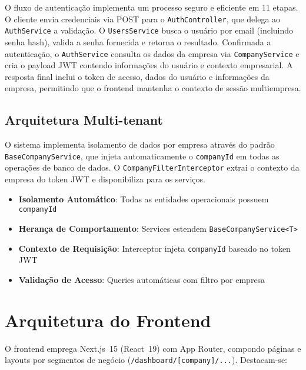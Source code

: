 O fluxo de autenticação implementa um processo seguro e eficiente em 11 etapas. O cliente envia credenciais via POST para o \texttt{AuthController}, que delega ao \texttt{AuthService} a validação. O \texttt{UsersService} busca o usuário por email (incluindo senha hash), valida a senha fornecida e retorna o resultado. Confirmada a autenticação, o \texttt{AuthService} consulta os dados da empresa via \texttt{CompanyService} e cria o payload JWT contendo informações do usuário e contexto empresarial. A resposta final inclui o token de acesso, dados do usuário e informações da empresa, permitindo que o frontend mantenha o contexto de sessão multiempresa.

\subsection{Arquitetura Multi-tenant}

O sistema implementa isolamento de dados por empresa através do padrão \texttt{BaseCompanyService}, que injeta automaticamente o \texttt{companyId} em todas as operações de banco de dados. O \texttt{CompanyFilterInterceptor} extrai o contexto da empresa do token JWT e disponibiliza para os serviços.

\begin{itemize}
  \item \textbf{Isolamento Automático}: Todas as entidades operacionais possuem \texttt{companyId}
  \item \textbf{Herança de Comportamento}: Services estendem \texttt{BaseCompanyService<T>}
  \item \textbf{Contexto de Requisição}: Interceptor injeta \texttt{companyId} baseado no token JWT
  \item \textbf{Validação de Acesso}: Queries automáticas com filtro por empresa
\end{itemize}

\section{Arquitetura do Frontend}
O frontend emprega Next.js~15 (React~19) com App Router, compondo páginas e layouts por segmentos de negócio (\texttt{/dashboard/[company]/...}). Destacam-se:


